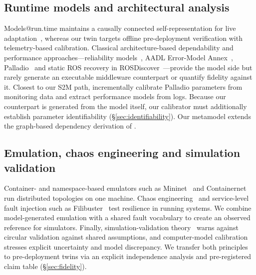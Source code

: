 \subsection{Runtime models and architectural analysis}

Models@run.time maintains a causally connected self-representation for live adaptation~\citep{blair2009models}, whereas our twin targets offline pre-deployment verification with telemetry-based calibration. Classical architecture-based dependability and performance approaches---reliability models~\citep{gosevapopstojanova2001architecture}, AADL Error-Model Annex~\citep{delange2014aadl}, Palladio~\citep{becker2009palladio} and static ROS recovery in ROSDiscover~\citep{timperley2022rosdiscover}---provide the model side but rarely generate an executable middleware counterpart or quantify fidelity against it. Closest to our S2M path, \citet{mazkatli2020incremental} incrementally calibrate Palladio parameters from monitoring data and \citet{walter2017expandable} extract performance models from logs. Because our counterpart is generated from the model itself, our calibrator must additionally establish parameter identifiability (\S\ref{sec:identifiability}). Our metamodel extends the graph-based dependency derivation of \citet{yigit2025graph}.

\subsection{Emulation, chaos engineering and simulation validation}

Container- and namespace-based emulators such as Mininet~\citep{lantz2010network} and Containernet~\citep{peuster2016medicine} run distributed topologies on one machine. Chaos engineering~\citep{basiri2016chaos} and service-level fault injection such as Filibuster~\citep{meiklejohn2021filibuster} test resilience in running systems. We combine model-generated emulation with a shared fault vocabulary to create an observed reference for simulators. Finally, simulation-validation theory~\citep{sargent2013verification,kleijnen2015design} warns against circular validation against shared assumptions, and computer-model calibration~\citep{kennedy2001bayesian} stresses explicit uncertainty and model discrepancy. We transfer both principles to pre-deployment twins via an explicit independence analysis and pre-registered claim table (\S\ref{sec:fidelity}).
